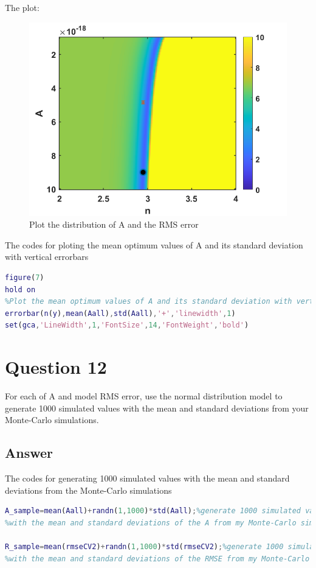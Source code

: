 \documentclass[
	12pt, %
]{fphw}
\begin{document}
The plot:
 \begin{figure}[htbp]
	\centering
	\includegraphics[width=1\columnwidth]{Q11.png} 
	\caption{Plot the distribution of A and the RMS error }
\end{figure}

The codes for ploting the mean optimum values of A and its standard deviation with vertical errorbars

  \begin{lstlisting}[language=Matlab,escapeinside=``]
figure(7)
hold on
%Plot the mean optimum values of A and its standard deviation with vertical errorbars
errorbar(n(y),mean(Aall),std(Aall),'+','linewidth',1)
set(gca,'LineWidth',1,'FontSize',14,'FontWeight','bold')
\end{lstlisting}

\clearpage

 \section*{Question 12 }

\begin{problem}
For each of A and model RMS error, use the normal distribution model to generate 1000 simulated values
with the mean and standard deviations from your Monte-Carlo simulations.	
\end{problem}

\subsection*{Answer}

The codes for generating 1000 simulated values
with the mean and standard deviations from the Monte-Carlo simulations
\begin{lstlisting}[language=Matlab,escapeinside=``]
A_sample=mean(Aall)+randn(1,1000)*std(Aall);%generate 1000 simulated values
%with the mean and standard deviations of the A from my Monte-Carlo simulations.

R_sample=mean(rmseCV2)+randn(1,1000)*std(rmseCV2);%generate 1000 simulated values
%with the mean and standard deviations of the RMSE from my Monte-Carlo simulations.
\end{lstlisting}
\end{document}
